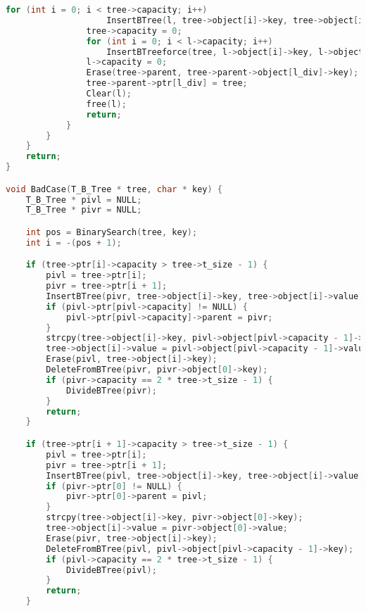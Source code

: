 \begin{lstlisting}[language=C]
                for (int i = 0; i < tree->capacity; i++)
                    InsertBTree(l, tree->object[i]->key, tree->object[i]->value, tree->ptr[i], tree->ptr[i + 1]);
                tree->capacity = 0;
                for (int i = 0; i < l->capacity; i++)
                    InsertBTreeforce(tree, l->object[i]->key, l->object[i]->value, l->ptr[i], l->ptr[i + 1]);
                l->capacity = 0;
                Erase(tree->parent, tree->parent->object[l_div]->key);
                tree->parent->ptr[l_div] = tree;
                Clear(l);
                free(l);
                return;
            }
        }
    }
    return;
}

void BadCase(T_B_Tree * tree, char * key) {
    T_B_Tree * pivl = NULL;
    T_B_Tree * pivr = NULL;

    int pos = BinarySearch(tree, key);
    int i = -(pos + 1);

    if (tree->ptr[i]->capacity > tree->t_size - 1) {
        pivl = tree->ptr[i];
        pivr = tree->ptr[i + 1];
        InsertBTree(pivr, tree->object[i]->key, tree->object[i]->value, pivl->ptr[pivl->capacity], NULL);
        if (pivl->ptr[pivl->capacity] != NULL) {
            pivl->ptr[pivl->capacity]->parent = pivr;
        }
        strcpy(tree->object[i]->key, pivl->object[pivl->capacity - 1]->key);
        tree->object[i]->value = pivl->object[pivl->capacity - 1]->value;
        Erase(pivl, tree->object[i]->key);
        DeleteFromBTree(pivr, pivr->object[0]->key);
        if (pivr->capacity == 2 * tree->t_size - 1) {
            DivideBTree(pivr);
        }
        return;
    }

    if (tree->ptr[i + 1]->capacity > tree->t_size - 1) {
        pivl = tree->ptr[i];
        pivr = tree->ptr[i + 1];
        InsertBTree(pivl, tree->object[i]->key, tree->object[i]->value, NULL, pivr->ptr[0]);
        if (pivr->ptr[0] != NULL) {
            pivr->ptr[0]->parent = pivl;
        }
        strcpy(tree->object[i]->key, pivr->object[0]->key);
        tree->object[i]->value = pivr->object[0]->value;
        Erase(pivr, tree->object[i]->key);
        DeleteFromBTree(pivl, pivl->object[pivl->capacity - 1]->key);
        if (pivl->capacity == 2 * tree->t_size - 1) {
            DivideBTree(pivl);
        }
        return;
    }


\end{lstlisting}
